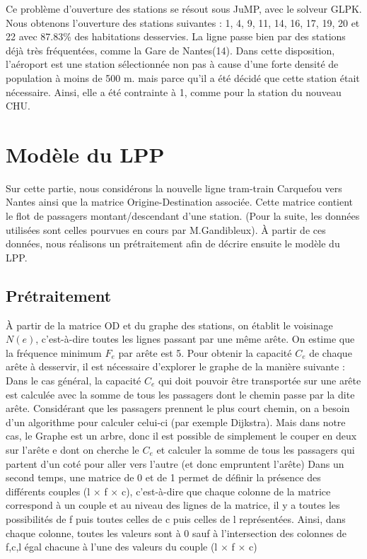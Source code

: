 \documentclass[a4paper,10pt]{article}
\begin{document}
Ce problème d'ouverture des stations se résout sous JuMP, avec le solveur GLPK. Nous obtenons l'ouverture des stations suivantes : 1, 4, 9, 11, 14, 16, 17, 19, 20 et 22 avec 87.83\% des habitations desservies. La ligne passe bien par des stations déjà très fréquentées, comme la Gare de Nantes(14). Dans cette disposition, l'aéroport est une station sélectionnée non pas à cause d'une forte densité de population à moins de 500 m. mais parce qu'il a été décidé que cette station était nécessaire. Ainsi, elle a été contrainte à 1, comme pour la station du nouveau CHU.


\section{Modèle du LPP}
Sur cette partie, nous considérons la nouvelle ligne tram-train Carquefou vers Nantes ainsi que la matrice Origine-Destination associée. Cette matrice contient le flot de passagers montant/descendant d'une station. (Pour la suite, les données utilisées sont celles pourvues en cours par M.Gandibleux). À partir de ces données, nous réalisons un prétraitement afin de décrire ensuite le modèle du LPP.

\subsection{Prétraitement}

À partir de la matrice OD et du graphe des stations, on établit le voisinage $N(e)$, c'est-à-dire toutes les lignes passant par une même arête. On estime que la fréquence minimum $F_e$ par arête est 5. Pour obtenir la capacité $C_e$ de chaque arête à desservir, il est nécessaire d'explorer le graphe de la manière suivante :
Dans le cas général, la capacité $C_e$ qui doit pouvoir être transportée sur une arête est calculée avec la somme de tous les passagers dont le chemin passe par la dite arête. Considérant que les passagers prennent le plus court chemin, on a besoin d'un algorithme pour calculer celui-ci (par exemple Dijkstra). Mais dans notre cas, le Graphe est un arbre, donc il est possible de simplement le couper en deux sur l'arête e dont on cherche le $C_e$ et calculer la somme de tous les passagers qui partent d'un coté pour aller vers l'autre (et donc empruntent l'arête)
Dans un second temps, une matrice de 0 et de 1 permet de définir la présence des différents couples (l $\times$ f $\times$ c), c'est-à-dire que chaque colonne de la matrice correspond à un couple et au niveau des lignes de la matrice, il y a toutes les possibilités de f puis toutes celles de c puis celles de l représentées. Ainsi, dans chaque colonne, toutes les valeurs sont à 0 sauf à l'intersection des colonnes de f,c,l égal chacune à l'une des valeurs du couple (l $\times$ f $\times$ c)     
\end{document}
